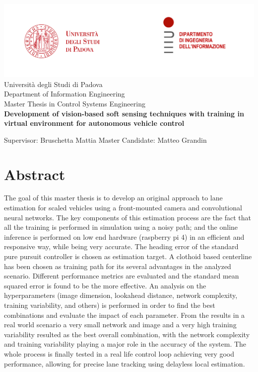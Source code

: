 \documentclass[a4paper,12pt,sort&compress]{article}
\begin{document}
\begin{titlepage}
    \centering
    \includegraphics[width=\linewidth]{loghi.png} %
    {\large
       Università degli Studi di Padova \\
       Department of Information Engineering\\
        Master Thesis in Control Systems Engineering\\
    }
        \vskip2cm
    {\bfseries\Large
        Development of vision-based soft sensing techniques with training in virtual environment for autonomous vehicle control\\
    }    
        \vskip2cm
    {\large
        \raggedright
        Supervisor: Bruschetta Mattia
        \vskip2cm
        \raggedleft
        Master Candidate: Matteo Grandin
    }
    \vfill

\end{titlepage}


\section{Abstract}
    The goal of this master thesis is to develop an original approach to lane estimation for scaled vehicles using a front-mounted camera and convolutional neural networks. The key components of this estimation process are the fact that all the training is performed in simulation using a noisy path; and the online inference is performed on low end hardware (raspberry pi 4) in an efficient and responsive way, while being very accurate. The heading error of the standard pure pursuit controller is chosen as estimation target. A clothoid based centerline has been chosen as training path for its several advantages in the analyzed scenario. Different performance metrics are evaluated and the standard mean squared error is found to be the more effective. An analysis on the hyperparameters (image dimension, lookahead distance, network complexity, training variability, and others) is performed in order to find the best combinations and evaluate the impact of each parameter. From the results in a real world scenario a very small network and image and a very high training variability resulted as the best overall combination, with the network complexity and training variability playing a major role in the accuracy of the system. The whole process is finally tested in a real life control loop achieving very good performance, allowing for precise lane tracking using delayless local estimation.
    \newpage
\end{document}

